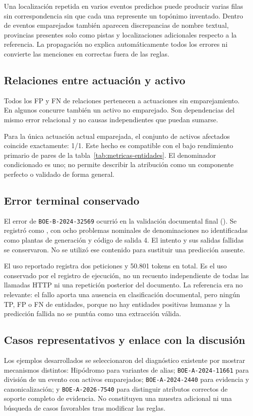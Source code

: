 Una localización repetida en varios eventos predichos puede producir varias
filas sin correspondencia sin que cada una represente un topónimo inventado.
Dentro de eventos emparejados también aparecen discrepancias de nombre
textual, provincias presentes solo como pistas y localizaciones adicionales
respecto a la referencia. La propagación no explica automáticamente todos
los errores ni convierte las menciones en correctas fuera de las reglas.

\subsection{Relaciones entre actuación y activo}
Todos los FP y FN de relaciones pertenecen a actuaciones sin emparejamiento.
En algunos concurre también un activo no emparejado. Son dependencias del
mismo error relacional y no causas independientes que puedan sumarse.

Para la única actuación actual emparejada, el conjunto de activos afectados
coincide exactamente: 1/1. Este hecho es compatible con el bajo rendimiento
primario de pares de la tabla~\ref{tab:metricas-entidades}. El denominador
condicionado es uno; no permite describir la atribución como un componente
perfecto o validado de forma general.

\subsection{Error terminal conservado}
El error de \texttt{BOE-B-2024-32569} ocurrió en la validación documental
final (). Se registró como
, con ocho problemas nominales de
denominaciones no identificadas como plantas de generación y código de
salida 4. El intento y sus salidas fallidas se conservaron. No se utilizó
ese contenido para sustituir una predicción ausente.

El uso reportado registra dos peticiones y 50.801 tokens en total.
Es el uso conservado por el registro de ejecución, no un recuento independiente de todas
las llamadas HTTP ni una repetición posterior del documento.
La referencia era no relevante: el fallo aporta una ausencia en clasificación documental,
pero ningún TP, FP o FN de entidades, porque no hay entidades positivas
humanas y la predicción fallida no se puntúa como una extracción válida.

\subsection{Casos representativos y enlace con la discusión}
Los ejemplos desarrollados se seleccionaron del diagnóstico existente por
mostrar mecanismos distintos: Hipódromo para variantes de alias;
\texttt{BOE-A-2024-11661} para división de un evento con activos emparejados;
\texttt{BOE-A-2024-2440} para evidencia y canonicalización; y
\texttt{BOE-A-2026-7540} para distinguir atributos correctos de soporte
completo de evidencia. No constituyen una muestra adicional ni una búsqueda
de casos favorables tras modificar las reglas.

